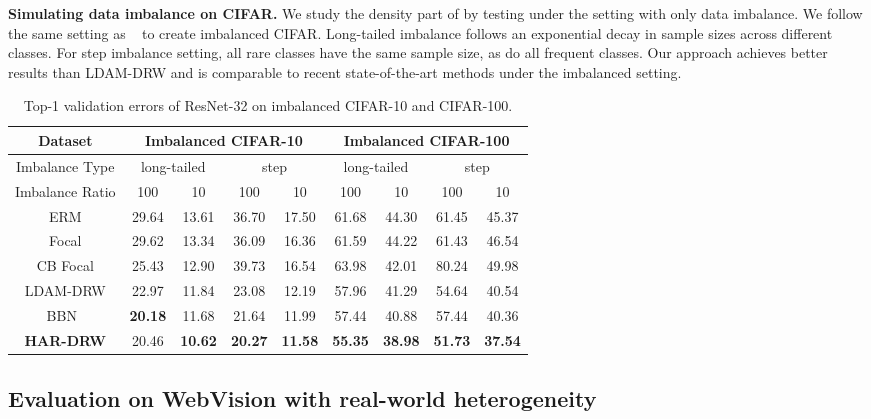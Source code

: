 \textbf{Simulating data imbalance on CIFAR.} We study the density part of \ours{} by testing under the setting with only data imbalance. We follow the same setting as ~\citet{cao2019learning} to create imbalanced CIFAR. Long-tailed imbalance follows an exponential decay in sample sizes across different classes. For step imbalance setting, all rare classes have the same sample size, as do all frequent classes. Our approach achieves better results than LDAM-DRW and is comparable to recent state-of-the-art methods under the imbalanced setting.


\begin{table}[htpb]
	\caption{Top-1 validation errors of ResNet-32 on imbalanced CIFAR-10 and CIFAR-100.}
	\label{tab:cifar-imb-table}
	\centering
	{\small
	\begin{tabular}{c|cc|cc|cc|cc}
		\toprule
		Dataset           & \multicolumn{4}{c|}{Imbalanced CIFAR-10}                               & \multicolumn{4}{c}{Imbalanced CIFAR-100}                              \\ \midrule
		Imbalance Type         & \multicolumn{2}{c|}{long-tailed} & \multicolumn{2}{c|}{step} & \multicolumn{2}{c|}{long-tailed} & \multicolumn{2}{c}{step} \\ \midrule
		Imbalance Ratio        & \multicolumn{1}{c|}{100}  & 10 & \multicolumn{1}{c|}{100}   & 10   & \multicolumn{1}{c|}{100}  & 10 & \multicolumn{1}{c|}{100}   & 10   \\ \midrule
		ERM & 29.64& 13.61& 36.70 & 17.50 & 61.68& 44.30 & 61.45& 45.37 \\
		Focal & 29.62 & 13.34 & 36.09 & 16.36 & 61.59 & 44.22 &  61.43                 & 46.54 \\
        CB Focal & 25.43 & 12.90 & 39.73 & 16.54 & 63.98 & 42.01 & 80.24 & 49.98 \\
	LDAM-DRW& 22.97 & 11.84 & 23.08 & 12.19& 57.96& 41.29& 54.64& 40.54 \\
	BBN~\citep{zhou2020bbn} & \textbf{20.18} & 11.68 & 21.64 & 11.99 & 57.44 & 40.88 & 57.44 & 40.36 \\
	\textbf{HAR-DRW} & 20.46 & \textbf{10.62} & \textbf{20.27} & \textbf{11.58} & \textbf{55.35}& \textbf{38.98} & \textbf{51.73} & \textbf{37.54} \\
		\bottomrule
	\end{tabular}}
\end{table}

\subsection{Evaluation on WebVision with real-world heterogeneity}
\label{sec:webvision}

